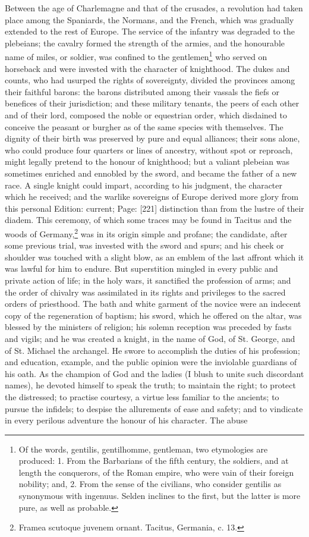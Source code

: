 Between the age of Charlemagne and that of the crusades, a revolution had taken place among the Spaniards, the Normans, and the French, which was gradually extended to the rest of Europe. The service of the infantry was degraded to the plebeians; the cavalry formed the strength of the armies, and the honourable name of miles, or soldier, was confined to the gentlemen\footnote{Of the words, gentilis, gentilhomme, gentleman, two etymologies are produced: 1. From the Barbarians of the fifth century, the soldiers, and at length the conquerors, of the Roman empire, who were vain of their foreign nobility; and, 2. From the sense of the civilians, who consider gentilis as synonymous with ingenuus. Selden inclines to the first, but the latter is more pure, as well as probable.} who served on horseback and were invested with the character of knighthood. The dukes and counts, who had usurped the rights of sovereignty, divided the provinces among their faithful barons: the barons distributed among their vassals the fiefs or benefices of their jurisdiction; and these military tenants, the peers of each other and of their lord, composed the noble or equestrian order, which disdained to conceive the peasant or burgher as of the same species with themselves. The dignity of their birth was preserved by pure and equal alliances; their sons alone, who could produce four quarters or lines of ancestry, without spot or reproach, might legally pretend to the honour of knighthood; but a valiant plebeian was sometimes enriched and ennobled by the sword, and became the father of a new race. A single knight could impart, according to his judgment, the character which he received; and the warlike sovereigns of Europe derived more glory from this personal Edition: current; Page: [221] distinction than from the lustre of their diadem. This ceremony, of which some traces may be found in Tacitus and the woods of Germany,\footnote{Framea scutoque juvenem ornant. Tacitus, Germania, c. 13.} was in its origin simple and profane; the candidate, after some previous trial, was invested with the sword and spurs; and his cheek or shoulder was touched with a slight blow, as an emblem of the last affront which it was lawful for him to endure. But superstition mingled in every public and private action of life; in the holy wars, it sanctified the profession of arms; and the order of chivalry was assimilated in its rights and privileges to the sacred orders of priesthood. The bath and white garment of the novice were an indecent copy of the regeneration of baptism; his sword, which he offered on the altar, was blessed by the ministers of religion; his solemn reception was preceded by fasts and vigils; and he was created a knight, in the name of God, of St. George, and of St. Michael the archangel. He swore to accomplish the duties of his profession; and education, example, and the public opinion were the inviolable guardians of his oath. As the champion of God and the ladies (I blush to unite such discordant names), he devoted himself to speak the truth; to maintain the right; to protect the distressed; to practise courtesy, a virtue less familiar to the ancients; to pursue the infidels; to despise the allurements of ease and safety; and to vindicate in every perilous adventure the honour of his character. The abuse 